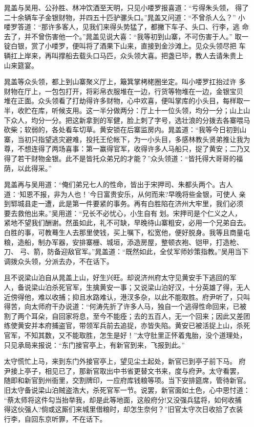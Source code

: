 晁盖与吴用、公孙胜、林冲饮酒至天明，只见小喽罗报喜道：“亏得朱头领，
得了二十余辆车子金银财物，并四五十匹驴骡头口。”晁盖又问道：“不曾杀人么？”
小喽罗答道：“那许多客人，见我们来得头势猛了，都撇下车子、头口、行李，逃
命去了，并不曾伤害他一个。”晁盖见说大喜：“我等初到山寨，不可伤害于人。”
取一锭白银，赏了小喽罗，便叫将了酒果下山来，直接到金沙滩上。见众头领尽把
车辆扛上岸来，再叫撑船去载头口马匹，众头领大喜。把盏已毕，教人去请朱贵上
山来筵宴。

晁盖等众头领，都上到山寨聚义厅上，簸箕掌栲栳圈坐定。叫小喽罗扛抬过许
多财物在厅上，一包包打开，将彩帛衣服堆在一边，行货等物堆在一边，金银宝贝
堆在正面。众头领看了打劫得许多财物，心中欢喜，便叫掌库的小头目，每样取一
半，收贮在库，听候支用。这一半分做两分：厅上十一位头领，均分一分；山上山
下众人，均分一分。把这新拿到的军健，脸上刺了字号，选壮浪的分拨去各寨喂马
砍柴；软弱的，各处看车切草。黄安锁在后寨监房内。晁盖道：“我等今日初到山
寨，当初只指望逃灾避难，投托王伦帐下，为一小头目，多感林教头贤弟推让我为
尊，不想连得了两场喜事：第一赢得官军，收得许多人马船只，捉了黄安；二乃又
得了若干财物金银。此不是皆托众弟兄的才能？”众头领道：“皆托得大哥哥的福
荫，以此得采。”

晁盖再与吴用道：“俺们弟兄七人的性命，皆出于宋押司、朱都头两个。古人
道：‘知恩不报，非为人也！’今日富贵安乐，从何而来?早晚将些金银，可使人
亲到郓城县走一遭，此是第一件要紧的事务。再有白胜陷在济州大牢里，我们必须
要去救他出来。”吴用道：“兄长不必忧心，小生自有划。宋押司是个仁义之人，
紧地不望我们酬谢。然虽如此，礼不可缺，早晚待山寨粗安，必用一个兄弟自去。
白胜的事，可教蓦生人去那里使钱，买上嘱下，松宽他，便好脱身。我等且商量屯
粮，造船，制办军器，安排寨栅、城垣，添造房屋，整顿衣袍、铠甲，打造枪、刀、
弓、箭，防备迎敌官军。”晁盖道：“既然如此，全仗军师妙策指教。”吴用当下
调拨众头领，分派去办，不在话下。

且不说梁山泊自从晁盖上山，好生兴旺。却说济州府太守见黄安手下逃回的军
人，备说梁山泊杀死官军，生擒黄安一事；又说梁山泊好汉，十分英雄了得，无人
近傍得他，难以收捕；抑且水路难认，港汊多杂，以此不能取胜。府尹听了，只叫
得苦，向太师府干办说道：“何涛先折了许多人马，独自一个逃得性命回来，已被
割了两个耳朵，自回家将息，至今不能痊；去的五百人，无一个回来；因此又差团
练使黄安并本府捕盗官，带领军兵前去追捉，亦皆失陷。黄安已被活捉上山，杀死
官军，不知其数，又不能取胜，怎生是好！”太守肚里正怀着鬼胎，没个道理处，
只见承局来报说：“东门接官亭上，有新官到来，飞报到此。”

太守慌忙上马，来到东门外接官亭上，望见尘土起处，新官已到亭子前下马。
府尹接上亭子，相见已了，那新官取出中书省更替文书来，度与府尹。太守看罢，
随即和新官到州衙里，交割牌印，一应府库钱粮等项。当下安排筵席，管待新官。
旧太守备说梁山泊贼盗浩大，杀死官军一节。说罢，新官面如土色，心中思忖道：
“蔡太师将这件勾当抬举我，却是此等地面，这般府分!又没强兵猛将，如何收捕
得这伙强人?倘或这厮们来城里借粮时，却怎生奈何？”旧官太守次日收拾了衣装
行李，自回东京听罪，不在话下。

